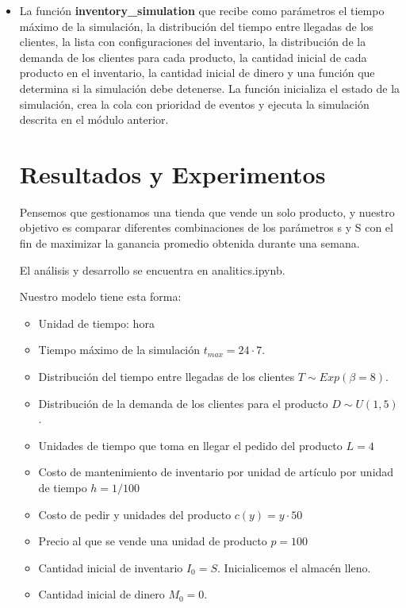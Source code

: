 \documentclass{article}
\begin{document}
\begin{itemize}
    \item La función \textbf{inventory\_simulation} que recibe como parámetros el tiempo máximo de la simulación, la distribución del
  tiempo entre llegadas de los clientes, la lista con configuraciones del inventario, la distribución de la demanda de
  los clientes
  para cada producto, la cantidad inicial de cada producto en el inventario, la cantidad inicial de dinero y una función
  que determina si
  la simulación debe detenerse.
  La función inicializa el estado de la simulación, crea la cola con prioridad de eventos y ejecuta la
  simulación descrita en el módulo anterior.


\section*{Resultados y Experimentos}

Pensemos que gestionamos una tienda que vende un solo producto, y nuestro objetivo es comparar diferentes combinaciones de los parámetros s y S con el fin de maximizar la ganancia promedio obtenida durante una semana.

\vspace{\baselineskip}

El análisis y desarrollo se encuentra en analitics.ipynb.

\vspace{\baselineskip}

Nuestro modelo tiene esta forma:
\begin{itemize}
    \item Unidad de tiempo: hora
    \item  Tiempo máximo de la simulación $t_{max} = 24 \cdot 7$.
    \item  Distribución del tiempo entre llegadas de los clientes $T \sim Exp(\beta = 8)$.
    \item  Distribución de la demanda de los clientes para el producto $D \sim U(1,5)$.
    \item Unidades de tiempo que toma en llegar el pedido del producto $L = 4$
    \item Costo de mantenimiento de inventario por unidad de artículo por unidad de tiempo $h=1/100$
    \item Costo de pedir y unidades del producto $c(y) = y \cdot 50$
    \item Precio al que se vende una unidad de producto $p = 100$
    \item Cantidad inicial de inventario $I_0 = S$. Inicialicemos el almacén lleno.
    \item Cantidad inicial de dinero $M_0 = 0$.
\end{itemize}


\end{itemize}
\end{document}
